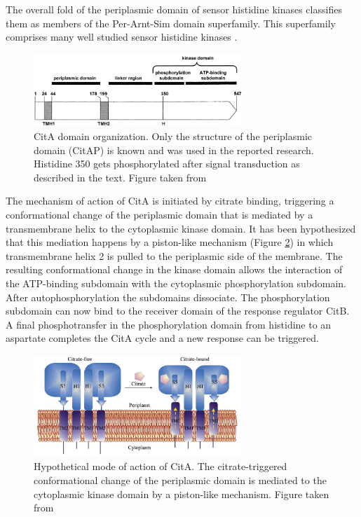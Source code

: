 \documentclass[english, a4paper, 12pt, titlepage, draft]{article}
\begin{document}
The overall fold of the periplasmic domain of sensor histidine kinases classifies them as members of the Per-Arnt-Sim domain superfamily.
This superfamily comprises many well studied sensor histidine kinases \cite{PAS}.


\begin{figure}
    \centering
    \includegraphics[width=0.7\textwidth]{figures/CitA_organization.png}
    \caption{CitA domain organization. Only the structure of the periplasmic domain (CitAP) is known and was used in the reported research. Histidine 350 gets phosphorylated after signal transduction as described in the text. Figure taken from \cite{CitA_original}}
    \label{fig:CitA_organization}
\end{figure}   


The mechanism of action of CitA \cite{CitA_original} is initiated by citrate binding, triggering a conformational change of the periplasmic domain that is mediated by a transmembrane helix to the cytoplasmic kinase domain.
It has been hypothesized that this mediation happens by a piston-like mechanism (Figure \ref{fig:CitA_mechanism}) in which transmembrane helix 2 is pulled to the periplasmic side of the membrane.
The resulting conformational change in the kinase domain allows the interaction of the ATP-binding subdomain with the cytoplasmic phosphorylation subdomain.
After autophosphorylation the subdomains dissociate.
The phosphorylation subdomain can now bind to the receiver domain of the response regulator CitB.
A final phosphotransfer in the phosphorylation domain from histidine to an aspartate completes the CitA cycle and a new response can be triggered.


\begin{figure}
    \centering
    \includegraphics[width=0.7\textwidth]{figures/CitA_mechanism.png}
    \caption{Hypothetical mode of action of CitA. The citrate-triggered conformational change of the periplasmic domain is mediated to the cytoplasmic kinase domain by a piston-like mechanism. Figure taken from \cite{CitA_2J80}}
    \label{fig:CitA_mechanism}
\end{figure}    
\end{document}
